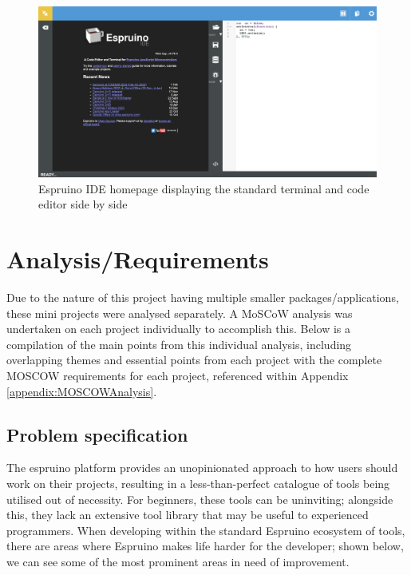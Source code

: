 \documentclass{l4proj}
\begin{document}
\begin{figure}[!ht]
    \centering
    \includegraphics[width=12cm]{dissertation/images/espruino-ide.png}
    \caption{Espruino IDE homepage displaying the standard terminal and code editor side by side}
    \label{fig:espruino-ide}
\end{figure}

\chapter{Analysis/Requirements}

\text Due to the nature of this project having multiple smaller packages/applications, these mini projects were analysed separately. A MoSCoW analysis \citep{waters2009prioritization} was undertaken on each project individually to accomplish this. Below is a compilation of the main points from this individual analysis, including overlapping themes and essential points from each project with the complete MOSCOW requirements for each project, referenced within Appendix \ref{appendix:MOSCOWAnalysis}.

\section{Problem specification}
\text The espruino platform provides an unopinionated approach to how users should work on their projects, resulting in a less-than-perfect catalogue of tools being utilised out of necessity. For beginners, these tools can be uninviting; alongside this, they lack an extensive tool library that may be useful to experienced programmers. When developing within the standard Espruino ecosystem of tools, there are areas where Espruino makes life harder for the developer; shown below, we can see some of the most prominent areas in need of improvement.
\end{document}
